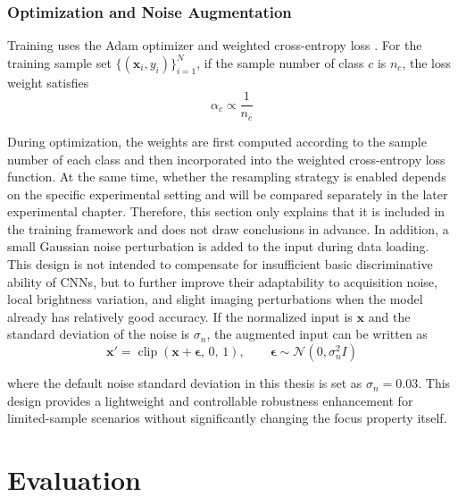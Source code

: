 \subsubsection{Optimization and Noise Augmentation}
\par Training uses the Adam optimizer and weighted cross-entropy loss
\cite{bottou2012stochastic}. For the training sample set
$\{(\mathbf{x}_i,y_i)\}_{i=1}^{N}$, if the sample number of class $c$ is
$n_c$, the loss weight satisfies
\begin{equation}
    \alpha_c \propto \frac{1}{n_c}
    \label{eq:cnn-class-weight-method}
\end{equation}
\par During optimization, the weights are first computed according to the sample
number of each class and then incorporated into the weighted cross-entropy loss
function. At the same time, whether the resampling strategy is enabled depends
on the specific experimental setting and will be compared separately in the
later experimental chapter. Therefore, this section only explains that it is
included in the training framework and does not draw conclusions in advance.
In addition, a small Gaussian noise perturbation is added to the input during
data loading. This design is not intended to compensate for insufficient basic
discriminative ability of CNNs, but to further improve their adaptability to
acquisition noise, local brightness variation, and slight imaging
perturbations when the model already has relatively good accuracy. If the
normalized input is $\mathbf{x}$ and the standard deviation of the noise is
$\sigma_n$, the augmented input can be written as
\begin{equation}
    \mathbf{x}'=\operatorname{clip}\!\left(\mathbf{x}+\boldsymbol{\epsilon},\,0,\,1\right),\qquad
    \boldsymbol{\epsilon}\sim\mathcal{N}(0,\sigma_n^2 I)
    \label{eq:cnn-noise-method}
\end{equation}
\par where the default noise standard deviation in this thesis is set as
$\sigma_n=0.03$. This design provides a lightweight and controllable robustness
enhancement for limited-sample scenarios without significantly changing the
focus property itself.

\section{Evaluation}
